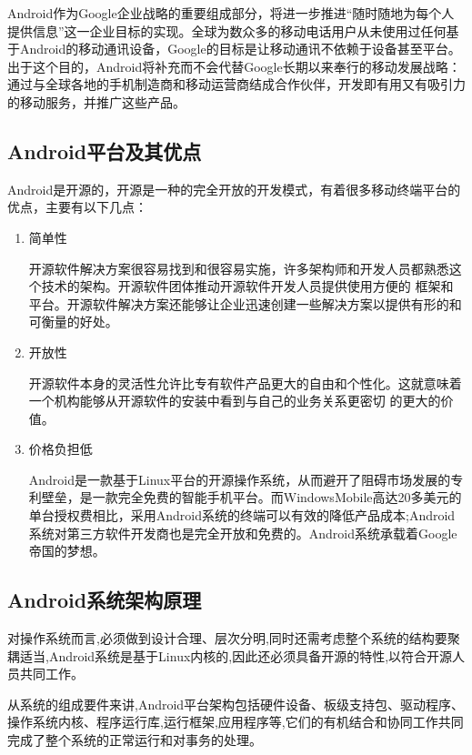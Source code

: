 \documentclass{XDBAthesis}
\begin{document}
Android作为Google企业战略的重要组成部分，将进一步推进“随时随地为每个人提供信息”这一企业目标的实现。全球为数众多的移动电话用户从未使用过任何基于Android的移动通讯设备，Google的目标是让移动通讯不依赖于设备甚至平台。出于这个目的，Android将补充而不会代替Google长期以来奉行的移动发展战略：通过与全球各地的手机制造商和移动运营商结成合作伙伴，开发即有用又有吸引力的移动服务，并推广这些产品。

\subsection{Android平台及其优点}

Android是开源的，开源是一种的完全开放的开发模式，有着很多移动终端平台的优点，主要有以下几点：
\begin{enumerate}
    \item 简单性

开源软件解决方案很容易找到和很容易实施，许多架构师和开发人员都熟悉这个技术的架构。开源软件团体推动开源软件开发人员提供使用方便的 框架和平台。开源软件解决方案还能够让企业迅速创建一些解决方案以提供有形的和可衡量的好处。
    \item 开放性
 
    
开源软件本身的灵活性允许比专有软件产品更大的自由和个性化。这就意味着一个机构能够从开源软件的安装中看到与自己的业务关系更密切 的更大的价值。 
    \item 价格负担低

Android是一款基于Linux平台的开源操作系统，从而避开了阻碍市场发展的专利壁垒，是一款完全免费的智能手机平台。而WindowsMobile高达20多美元的单台授权费相比，采用Android系统的终端可以有效的降低产品成本;Android系统对第三方软件开发商也是完全开放和免费的。Android系统承载着Google帝国的梦想。
    
\end{enumerate}





\subsection{Android系统架构原理}

    对操作系统而言,必须做到设计合理、层次分明,同时还需考虑整个系统的结构要聚耦适当,Android系统是基于Linux内核的,因此还必须具备开源的特性,以符合开源人员共同工作。 

    从系统的组成要件来讲,Android平台架构包括硬件设备、板级支持包、驱动程序、操作系统内核、程序运行库,运行框架,应用程序等,它们的有机结合和协同工作共同完成了整个系统的正常运行和对事务的处理。 
\end{document}
